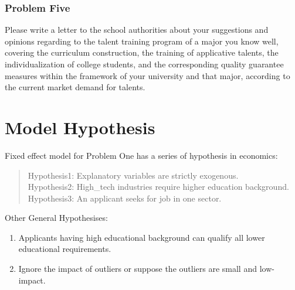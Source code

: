 \documentclass{mcmthesis}
\begin{document}
\subsubsection{Problem Five}
Please write a letter to the school authorities about your suggestions and opinions regarding to the talent training program of a major you know well, covering the curriculum construction, the training of applicative talents, the individualization of college students, and the corresponding quality guarantee measures within the framework of your university and that major, according to the current market demand for talents.


\section{Model Hypothesis}
Fixed effect model for Problem One has a series of hypothesis in economics:
\begin{quote}
Hypothesis1: Explanatory variables are strictly exogenous. \\
Hypothesis2: High\_tech industries require higher education background. \\
Hypothesis3: An applicant seeks for job in one sector. \\
\end{quote}
Other General Hypothesises:
\begin{enumerate}
	\item Applicants having high educational background can qualify all lower educational requirements.
	\item Ignore the impact of outliers or suppose the outliers are small and low-impact.
\end{enumerate}



\end{document}

